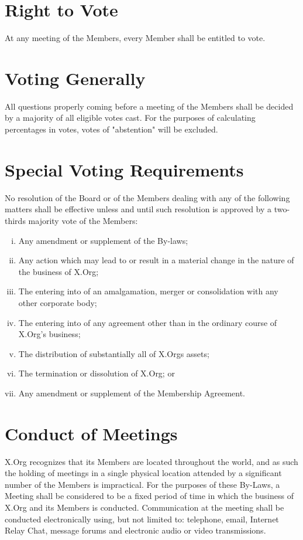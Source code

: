 \documentclass[10pt, english]{bylaws}
\begin{document}
\section{Right to Vote}
At any meeting of the Members, every Member shall be entitled to vote.

\section{Voting Generally}
All questions properly coming before a meeting of the Members shall be decided
by a majority of all eligible votes cast.  For the purposes of calculating
percentages in votes, votes of "abstention" will be excluded.

\section{Special Voting Requirements}
\label{section_voting_requirements}

No resolution of the Board or of the Members dealing with any of the following
matters shall be effective unless and until such resolution is approved by a
two-thirds majority vote of the Members:

\begin{enumerate}[(i)\hspace{.2cm}]
	\item Any amendment or supplement of the By-laws;

	\item Any action which may lead to or result in a material change in
	the nature of the business of X.Org;

	\item The entering into of an amalgamation, merger or consolidation with
	any other corporate body;

	\item The entering into of any agreement other than in the ordinary
	course of X.Org's business;

	\item The distribution of substantially all of X.Orgs assets;

	\item The termination or dissolution of X.Org; or

	\item Any amendment or supplement of the Membership Agreement.
\end{enumerate}

\section{Conduct of Meetings}
X.Org recognizes that its Members are located throughout the world, and as such
the holding of meetings in a single physical location attended by a significant
number of the Members is impractical. For the purposes of these By-Laws, a
Meeting shall be considered to be a fixed period of time in which the business
of X.Org and its Members is conducted. Communication at the meeting shall be
conducted electronically using, but not limited to: telephone, email, Internet
Relay Chat, message forums and electronic audio or video transmissions.
\end{document}
